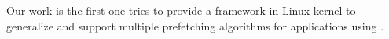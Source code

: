 
Our work is the first one tries to provide a framework in Linux kernel to generalize and support multiple prefetching algorithms for applications using \ebpf.



